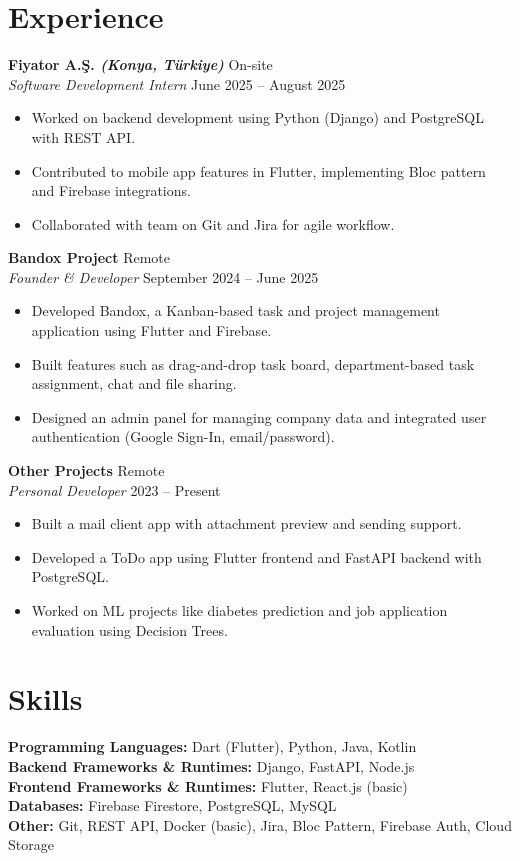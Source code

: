 \documentclass[10pt,a4paper]{extarticle}
\begin{document}
\section{Experience}
\textbf{Fiyator A.Ş. \textit{(Konya, Türkiye)}} \hfill On-site\\
\textit{Software Development Intern} \hfill June 2025 -- August 2025
\begin{itemize}[leftmargin=*,noitemsep,topsep=0pt]
    \item Worked on backend development using Python (Django) and PostgreSQL with REST API.
    \item Contributed to mobile app features in Flutter, implementing Bloc pattern and Firebase integrations.
    \item Collaborated with team on Git and Jira for agile workflow.
\end{itemize}
\textbf{Bandox Project} \hfill Remote\\
\textit{Founder \& Developer} \hfill September 2024 -- June 2025
\begin{itemize}[leftmargin=*,noitemsep,topsep=0pt]
    \item Developed Bandox, a Kanban-based task and project management application using Flutter and Firebase.
    \item Built features such as drag-and-drop task board, department-based task assignment, chat and file sharing.
    \item Designed an admin panel for managing company data and integrated user authentication (Google Sign-In, email/password).
\end{itemize}
\textbf{Other Projects} \hfill Remote\\
\textit{Personal Developer} \hfill 2023 -- Present
\begin{itemize}[leftmargin=*,noitemsep,topsep=0pt]
    \item Built a mail client app with attachment preview and sending support.
    \item Developed a ToDo app using Flutter frontend and FastAPI backend with PostgreSQL.
    \item Worked on ML projects like diabetes prediction and job application evaluation using Decision Trees.
\end{itemize}
\section{Skills}
\textbf{Programming Languages:} Dart (Flutter), Python, Java, Kotlin\\
\textbf{Backend Frameworks \& Runtimes:} Django, FastAPI, Node.js\\
\textbf{Frontend Frameworks \& Runtimes:} Flutter, React.js (basic)\\
\textbf{Databases:} Firebase Firestore, PostgreSQL, MySQL\\
\textbf{Other:} Git, REST API, Docker (basic), Jira, Bloc Pattern, Firebase Auth, Cloud Storage
\end{document}
